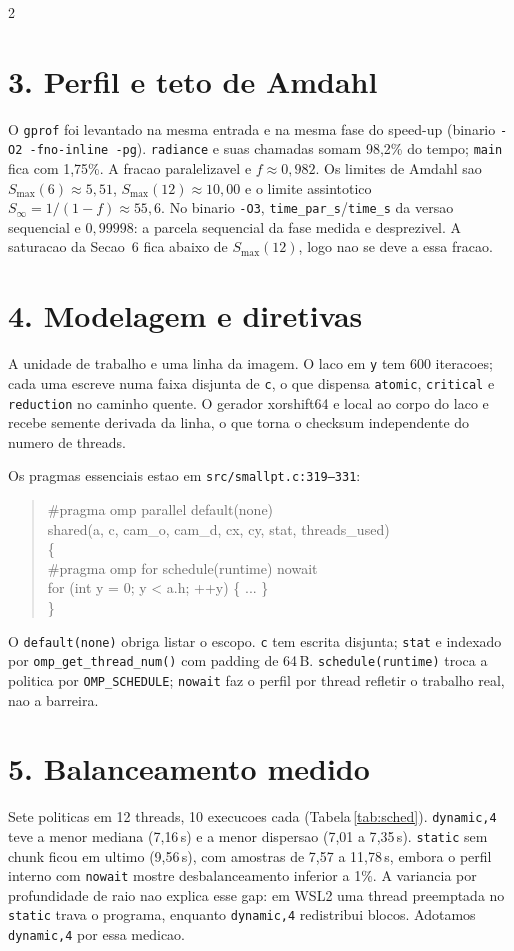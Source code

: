 \documentclass[10pt,a4paper]{article}
\begin{document}
\begin{multicols}{2}
\section*{3. Perfil e teto de Amdahl}
O \texttt{gprof} foi levantado na mesma entrada e na mesma fase do
speed-up (binario \texttt{-O2 -fno-inline -pg}). \texttt{radiance} e
suas chamadas somam 98{,}2\% do tempo; \texttt{main} fica com 1{,}75\%.
A fracao paralelizavel e $f \approx 0{,}982$. Os limites de Amdahl sao
$S_{\max}(6) \approx 5{,}51$, $S_{\max}(12) \approx 10{,}00$ e o limite
assintotico $S_{\infty}=1/(1-f)\approx 55{,}6$. No binario \texttt{-O3},
\texttt{time\_par\_s}/\texttt{time\_s} da versao sequencial e $0{,}99998$:
a parcela sequencial da fase medida e desprezivel. A saturacao da
Secao~6 fica abaixo de $S_{\max}(12)$, logo nao se deve a essa fracao.

\section*{4. Modelagem e diretivas}
A unidade de trabalho e uma linha da imagem. O laco em \texttt{y} tem
600 iteracoes; cada uma escreve numa faixa disjunta de \texttt{c}, o que
dispensa \texttt{atomic}, \texttt{critical} e \texttt{reduction} no caminho
quente. O gerador xorshift64 e local ao corpo do laco e recebe semente
derivada da linha, o que torna o checksum independente do numero de threads.

Os pragmas essenciais estao em \texttt{src/smallpt.c:319--331}:
\begin{quote}\small\ttfamily
\#pragma omp parallel default(none) \\
\quad shared(a, c, cam\_o, cam\_d, cx, cy, stat, threads\_used) \\
\{ \\
\quad \#pragma omp for schedule(runtime) nowait \\
\quad for (int y = 0; y < a.h; ++y) \{ ... \} \\
\}
\end{quote}
O \texttt{default(none)} obriga listar o escopo. \texttt{c} tem escrita
disjunta; \texttt{stat} e indexado por \texttt{omp\_get\_thread\_num()}
com padding de 64\,B. \texttt{schedule(runtime)} troca a politica por
\texttt{OMP\_SCHEDULE}; \texttt{nowait} faz o perfil por thread refletir
o trabalho real, nao a barreira.

\section*{5. Balanceamento medido}
Sete politicas em 12 threads, 10 execucoes cada (Tabela\,\ref{tab:sched}).
\texttt{dynamic,4} teve a menor mediana (7{,}16\,s) e a menor dispersao
(7{,}01 a 7{,}35\,s). \texttt{static} sem chunk ficou em ultimo
(9{,}56\,s), com amostras de 7{,}57 a 11{,}78\,s, embora o perfil
interno com \texttt{nowait} mostre desbalanceamento inferior a 1\%.
A variancia por profundidade de raio nao explica esse gap: em WSL2 uma
thread preemptada no \texttt{static} trava o programa, enquanto
\texttt{dynamic,4} redistribui blocos. Adotamos \texttt{dynamic,4} por
essa medicao.


\end{multicols}
\end{document}
